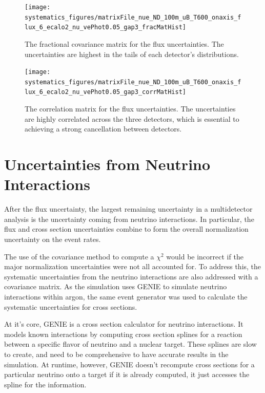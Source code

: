 \begin{figure}[]
    \centering
    \texttt{[image: systematics\_figures/matrixFile\_nue\_ND\_100m\_uB\_T600\_onaxis\_flux\_6\_ecalo2\_nu\_vePhot0.05\_gap3\_fracMatHist]}
    \caption[Flux Fractional Covariance Matrix]{The fractional covariance matrix for the flux uncertainties.  The uncertainties are highest in the tails of each detector's distributions.}
   \label{fig:syst_flux_fracmatrix}
\end{figure}
\begin{figure}[]
    \centering
    \texttt{[image: systematics\_figures/matrixFile\_nue\_ND\_100m\_uB\_T600\_onaxis\_flux\_6\_ecalo2\_nu\_vePhot0.05\_gap3\_corrMatHist]}
    \caption[Flux Correlation Matrix]{The correlation matrix for the flux uncertainties. The uncertainties are highly correlated across the three detectors, which is essential to achieving a strong cancellation between detectors. }
   \label{fig:syst_flux_corrmatrix}
\end{figure}



\section{Uncertainties from Neutrino Interactions}

After the flux uncertainty, the largest remaining uncertainty in a multidetector analysis is the uncertainty coming from neutrino interactions.  In particular, the flux and cross section uncertainties combine to form the overall normalization uncertainty on the event rates.

The use of the covariance method to compute a $\chi^2$ would be incorrect if the major normalization uncertainties were not all accounted for.  To address this, the systematic uncertainties from the neutrino interactions are also addressed with a covariance matrix.  As the simulation uses GENIE \cite{Andreopoulos:2009rq} to simulate neutrino interactions within argon, the same event generator was used to calculate the systematic uncertainties for cross sections.

At it's core, GENIE is a cross section calculator for neutrino interactions.  It models known interactions by computing cross section splines for a reaction between a specific flavor of neutrino and a nuclear target.  These splines are slow to create, and need to be comprehensive to have accurate results in the simulation.  At runtime, however, GENIE doesn't recompute cross sections for a particular neutrino onto a target if it is already computed, it just accesses the spline for the information.

